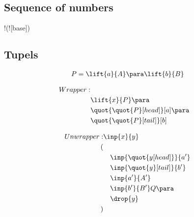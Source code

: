 \subsection{Sequence of numbers}
!(![base]\para {})

\subsection{Tupels}
\begin{align*}
P=\lift{a}{A}\para \lift{b}{B}
\end{align*}



\begin{align*}
Wrapper:
\\ & \lift{x}{P}\para
\\ & \quot{\quot{P}[head]}[a]\para
\\ & \quot{\quot{P}[tail]}[b]
\end{align*}

\begin{align*}
Unwrapper: &\inp{x}{y}\\
(\\
&\quad \inp{\quot{y[head]}}{a'}\\
&\quad \inp{\quot{y}[tail]}{b'}\\
&\quad \inp{a'}{A'}\\
&\quad \inp{b'}{B'}Q\para\\
&\quad \drop{y}\\
)
\end{align*}